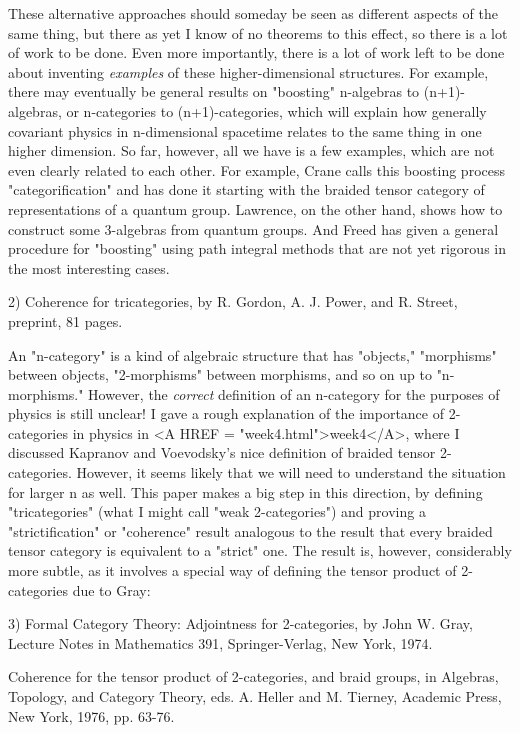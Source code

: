 These alternative approaches should someday be seen as different aspects
of the same thing, but there as yet I know of no theorems to this
effect, so there is a lot of work to be done.  Even more importantly,
there is a lot of work left to be done about inventing \emph{examples} of
these higher-dimensional structures.  For example, there may eventually
be general results on "boosting" n-algebras to (n+1)-algebras, or
n-categories to (n+1)-categories, which will explain how generally
covariant physics in n-dimensional spacetime relates to the same thing
in one higher dimension.  So far, however, all we have is a few
examples, which are not even clearly related to each other.  For
example, Crane calls this boosting process "categorification" and has
done it starting with the braided tensor category of representations of
a quantum group.  Lawrence, on the other hand, shows how to construct
some 3-algebras from quantum groups.  And Freed has given a general
procedure for "boosting" using path integral methods that are not yet
rigorous in the most interesting cases.

2) Coherence for tricategories, by R. Gordon, A. J. Power, and R.
Street, preprint, 81 pages.

An "n-category" is a kind of algebraic structure that has "objects,"
"morphisms" between objects, "2-morphisms" between morphisms, and so on
up to "n-morphisms."  However, the \emph{correct} definition of an n-category
for the purposes of physics is still unclear!  I gave a rough
explanation of the importance of 2-categories in physics in <A HREF = "week4.html">week4</A>, where
I discussed Kapranov and Voevodsky's nice definition of braided tensor
2-categories.  However, it seems likely that we will need to understand
the situation for larger n as well.  This paper makes a big step in this
direction, by defining "tricategories" (what I might call "weak
2-categories") and proving a "strictification" or "coherence" result
analogous to the result that every braided tensor category is equivalent
to a "strict" one.  The result is, however, considerably more subtle, as
it involves a special way of defining the tensor product of 2-categories
due to Gray:

3) Formal Category Theory: Adjointness for 2-categories, by John W.
Gray, Lecture Notes in Mathematics 391, Springer-Verlag, New York, 1974.   

Coherence for the tensor product of 2-categories, and braid groups, in
Algebras, Topology, and Category Theory, eds. A. Heller and M. Tierney,
Academic Press, New York, 1976, pp. 63-76.  

